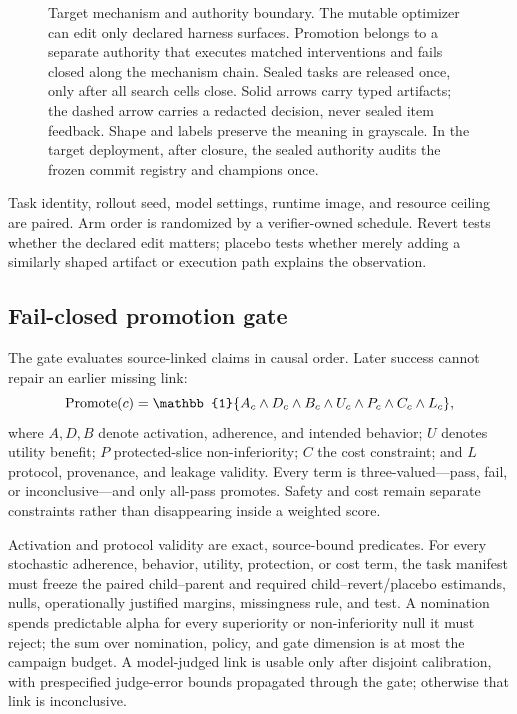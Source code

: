 \begin{figure}[ht]
  \centering
  
  \caption{Target mechanism and authority boundary.  The mutable optimizer can edit
  only declared harness surfaces.  Promotion belongs to a separate authority
  that executes matched interventions and fails closed along the mechanism
  chain.  Sealed tasks are released once, only after all search cells close.
  Solid arrows carry typed artifacts; the dashed arrow carries a redacted
  decision, never sealed item feedback.  Shape and labels preserve the meaning
  in grayscale.  In the target deployment, after closure, the sealed authority audits the frozen commit
  registry and champions once.}
  \label{fig:mechanism-boundary}
\end{figure}

Task identity, rollout seed, model settings, runtime image, and resource ceiling
are paired.  Arm order is randomized by a verifier-owned schedule.  Revert
tests whether the declared edit matters; placebo tests whether merely adding a
similarly shaped artifact or execution path explains the observation.

\subsection{Fail-closed promotion gate}

The gate evaluates source-linked claims in causal order.  Later success cannot
repair an earlier missing link:
\[
\promote(c)=
\mathbb{1}\{A_c\land D_c\land B_c\land U_c\land P_c\land C_c\land L_c\},
\]
where \(A,D,B\) denote activation, adherence, and intended behavior; \(U\)
denotes utility benefit; \(P\) protected-slice non-inferiority; \(C\) the cost
constraint; and \(L\) protocol, provenance, and leakage validity.  Every term is
three-valued---pass, fail, or inconclusive---and only all-pass promotes.  Safety
and cost remain separate constraints rather than disappearing inside a weighted
score.

Activation and protocol validity are exact, source-bound predicates.  For every
stochastic adherence, behavior, utility, protection, or cost term, the task
manifest must freeze the paired child--parent and required child--revert/placebo
estimands, nulls, operationally justified margins, missingness rule, and test.
A nomination spends predictable alpha for every superiority or non-inferiority
null it must reject; the sum over nomination, policy, and gate dimension is at
most the campaign budget.  A model-judged link is usable only after disjoint
calibration, with prespecified judge-error bounds propagated through the gate;
otherwise that link is inconclusive.

